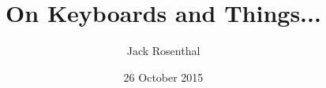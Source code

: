 \documentclass{beamer}
\title{On Keyboards and Things...}
\author{Jack Rosenthal}
\date{26 October 2015}
\begin{document}
%


\begin{frame}
    \maketitle
\end{frame}
\end{document}
